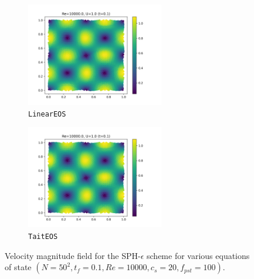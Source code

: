 \begin{figure}[htbp!]
  \begin{subfigure}{7cm}
  \centering\includegraphics[width=6cm]{Code-Figures/mon2017/eos/c0_20_linear_pec_dtmul_1_nx_50_pst_10_re_10000_mon2017/final_vmag.png}
  \caption{\texttt{LinearEOS}}
  \end{subfigure}
  \begin{subfigure}{7cm}
  \centering\includegraphics[width=6cm]{Code-Figures/mon2017/eos/c0_20_tait_pec_dtmul_1_nx_50_pst_10_re_10000_mon2017/final_vmag.png}
  \caption{\texttt{TaitEOS}}
  \end{subfigure}
  \caption{Velocity magnitude field for the SPH-$\epsilon$ scheme for various equations of state $(N=50^2, t_f=0.1, Re=10000, c_s=20, f_{pst}=100)$.}
  \label{fig:sph-eps-eos-vmag}
\end{figure}

